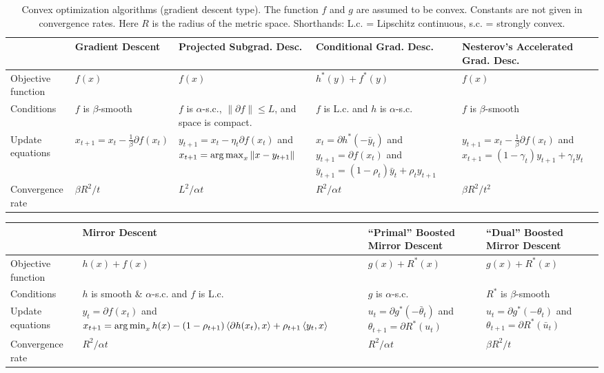\documentclass[reqno,oneside,a4paper]{amsart}
\newcommand{\ip}[2]{\left\langle #1, #2 \right\rangle}
\begin{document}
\begin{landscape}

\begin{table}[htdp]
\begin{center}
\begin{tabular}{|l|p{4.05cm}|p{4.05cm}|p{4.05cm}|p{4.05cm}|}
\hline & Gradient Descent & Projected Subgrad. Desc. & Conditional Grad. Desc. & Nesterov's Accelerated Grad. Desc.   \\ 
\hline
Objective function  &
$f(x)$ &
$f(x)$ &
$h^{*}(y) + f^{*}(y)$ &
$f(x)$ \\
\hline
Conditions & 
$f$ is $\beta$-smooth &
$f$ is $\alpha$-s.c., $\|\partial f\| \le L$, and space is compact. & 
$f$ is L.c. and $h$ is $\alpha$-s.c. &
$f$ is $\beta$-smooth \\
\hline
Update equations &
$x_{t+1} = x_{t} - \frac{1}{\beta}\partial f(x_{t})$ &
$y_{t+1} = x_{t} - \eta_{t}\partial f(x_{t})$ and $x_{t+1} = \argmax_{x} \| x - y_{t+1} \|$ &
$x_{t} = \partial h^{*}(-\bar y_{t})$ and $y_{t+1} = \partial f(x_{t})$ and $\bar y_{t+1} = (1 - \rho_{t})\bar y_{t} + \rho_{t} y_{t+1}$&
$y_{t+1} = x_{t} - \frac{1}{\beta}\partial f(x_{t})$ and $x_{t+1} = (1- \gamma_{t})y_{t+1} + \gamma_{t}y_{t}$ \\
\hline
Convergence rate &
$\beta R^{2}/t$ &
$L^{2} / \alpha t$ &
$R^{2} / \alpha t$ &
$\beta R^{2}/t^{2}$ \\
\hline
\end{tabular}
\caption{Convex optimization algorithms (gradient descent type). The function $f$ and $g$ are assumed to be convex. Constants are not given in convergence rates. Here $R$ is the radius of the metric space. Shorthands: L.c. = Lipschitz continuous, s.c. = strongly convex. }
\label{table:gd-convex-opt-algs}
\end{center}
\end{table}

\begin{table}[htdp]
\begin{center}
\begin{tabular}{|l|p{5.5cm}|p{5.5cm}|p{5.5cm}|}
\hline & Mirror Descent & ``Primal'' Boosted Mirror Descent & ``Dual'' Boosted Mirror Descent  \\ 
\hline
Objective function & 
$h(x) + f(x)$ & 
$g(x) + R^{*}(x)$ & 
$g(x) + R^{*}(x)$ \\
\hline
Conditions & 
$h$ is smooth \& $\alpha$-s.c. and $f$ is L.c. & 
$g$ is $\alpha$-s.c.& 
$R^{*}$ is $\beta$-smooth \\
\hline
Update equations & 
$y_{t} = \partial f(x_{t})$ and 
$x_{t+1} = \argmin_{x} h(x) - (1 - \rho_{t+1})\ip{\partial h(x_{t})}{x} + \rho_{t+1}\ip{y_{t}}{x}$ &
$u_{t} = \partial g^{*}(-\bar \theta_{t})$ and $\theta_{t+1} = \partial R^{*}(u_{t})$ & 
$u_{t} = \partial g^{*}(-\theta_{t})$ and $\theta_{t+1} = \partial R^{*}(\bar u_{t})$ \\
\hline
Convergence rate & 
$R^{2}/\alpha t$ & 
$R^{2}/\alpha t$ & 
$\beta R^{2} / t$ \\
\hline


\end{tabular}
\end{center}
\end{table}
\end{landscape}
\end{document}
